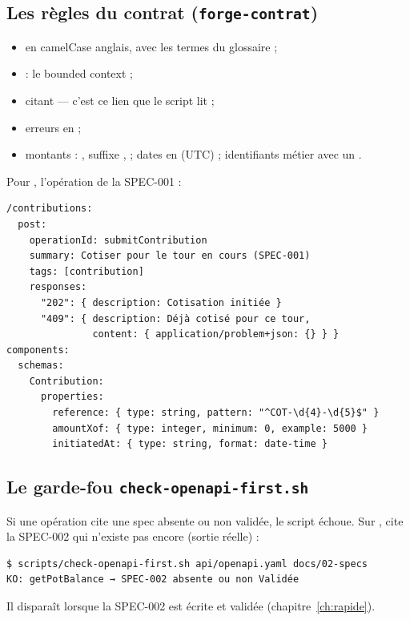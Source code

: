 \subsection*{Les règles du contrat (\texttt{forge-contrat})}
\begin{itemize}
  \item {} en camelCase anglais, avec les termes du glossaire ;
  \item {} : le bounded context ;
  \item {} citant  --- c'est ce lien que le script lit ;
  \item erreurs en  ;
  \item montants : , suffixe ,  ; dates en  (UTC) ; identifiants métier avec un .
\end{itemize}
Pour \sika{}, l'opération de la SPEC-001 :
\begin{code}
\begin{Verbatim}
/contributions:
  post:
    operationId: submitContribution
    summary: Cotiser pour le tour en cours (SPEC-001)
    tags: [contribution]
    responses:
      "202": { description: Cotisation initiée }
      "409": { description: Déjà cotisé pour ce tour,
               content: { application/problem+json: {} } }
components:
  schemas:
    Contribution:
      properties:
        reference: { type: string, pattern: "^COT-\d{4}-\d{5}$" }
        amountXof: { type: integer, minimum: 0, example: 5000 }
        initiatedAt: { type: string, format: date-time }
\end{Verbatim}
\end{code}

\subsection*{Le garde-fou \texttt{check-openapi-first.sh}}
Si une opération cite une spec absente ou non validée, le script échoue. Sur \sika{},  cite la SPEC-002 qui n'existe pas encore (sortie réelle) :
\begin{code}
\begin{Verbatim}
$ scripts/check-openapi-first.sh api/openapi.yaml docs/02-specs
KO: getPotBalance → SPEC-002 absente ou non Validée
\end{Verbatim}
\end{code}
Il disparaît lorsque la SPEC-002 est écrite et validée (chapitre~\ref{ch:rapide}).

